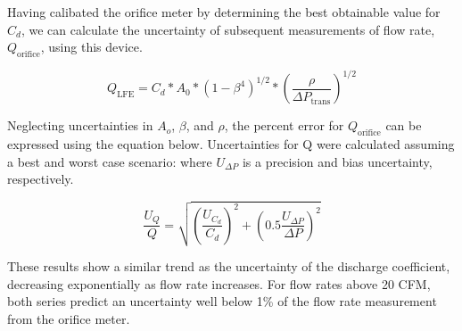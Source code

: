 \documentclass{article}
\begin{document}
Having calibated the orifice meter by determining the best obtainable value for $C_d$, we can 
calculate the uncertainty of subsequent measurements of flow rate, $Q_{\text{orifice}}$, using this device.

\begin{equation}
  Q_{\text{LFE}} = C_d * A_0 * (1-\beta^4)^{1/2} * \left(\frac{\rho}{\Delta P_{\text{trans}}}\right)^{1/2}
\end{equation}

Neglecting uncertainties in $A_o$, $\beta$, and $\rho$, the percent error for $Q_{\text{orifice}}$ 
can be expressed using the equation below. Uncertainties for Q were calculated 
assuming a best and worst case scenario: where $U_{\Delta P}$ is a precision
 and bias uncertainty, respectively.

\begin{equation}
  \frac{U_{Q}}{Q} = \sqrt{ \left(\frac{U_{C_d}}{C_d}\right)^2 + \left( 0.5 \frac{U_{\Delta P}}{\Delta P} \right)^2}
\end{equation}

These results show a similar trend as the uncertainty of the discharge coefficient, decreasing 
exponentially as flow rate increases. For flow rates above 20 CFM, both series predict an uncertainty 
well below 1\% of the flow rate measurement from the orifice meter.

%
%
%
\end{document}
